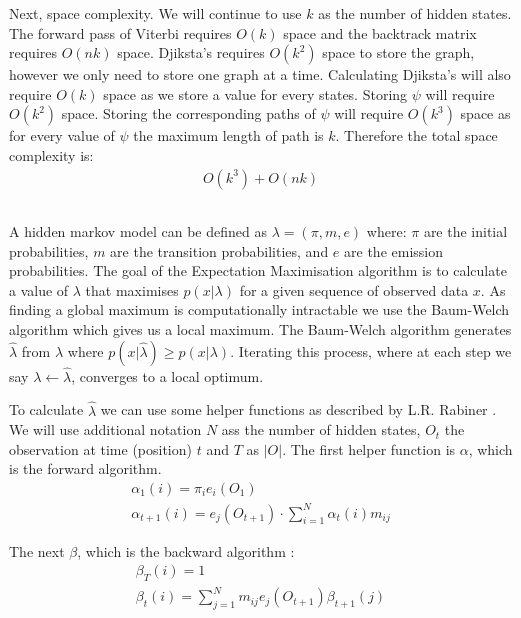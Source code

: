 Next, space complexity. We will continue to use $k$ as the number of hidden states. The forward pass of Viterbi requires $O(k)$ space and the backtrack matrix requires $O(nk)$ space. Djiksta's requires $O(k^2)$ space to store the graph, however we only need to store one graph at a time. Calculating Djiksta's will also require $O(k)$ space as we store a value for every states. Storing $\psi$ will require $O(k^2)$ space. Storing the corresponding paths of $\psi$ will require $O(k^3)$ space as for every value of $\psi$ the maximum length of path is $k$. Therefore the total space complexity is:
\begin{align*}
    O(k^3) + O(nk)
\end{align*} 



\subsection{}
A hidden markov model can be defined as $\lambda = (\pi, m, e)$ where: $\pi$ are the initial probabilities, $m$ are the transition probabilities, and $e$ are the emission probabilities.
The goal of the Expectation Maximisation algorithm is to calculate a value of $\lambda$ that maximises $p(x|\lambda)$ for a given sequence of observed data $x$. As finding a global maximum is computationally intractable we use the Baum-Welch algorithm which gives us a local maximum. The Baum-Welch algorithm generates $\hat{\lambda}$ from $\lambda$ where $p(x|\hat{\lambda}) \geq p(x|\lambda)$. Iterating this process, where at each step we say $\lambda \gets \hat{\lambda}$, converges to a local optimum.

To calculate $\hat{\lambda}$ we can use some helper functions as described by L.R. Rabiner \cite{em}. We will use additional notation $N$ ass the number of hidden states, $O_t$ the observation at time (position) $t$ and $T$ as $|O|$.  The first helper function is $\alpha$, which is the forward algorithm.
\begin{gather*}
    \alpha_1(i) = \pi_i e_i(O_1)\\
    \alpha_{t+1}(i) = e_j(O_{t+1}) \cdot \sum_{i=1}^N\alpha_t(i)m_{ij}
\end{gather*}

The next $\beta$, which is the backward algorithm :
\begin{gather*}
    \beta_T(i)=1\\
    \beta_t(i)=\sum_{j=1}^N m_{ij} e_j(O_{t+1}) \beta_{t+1}(j)
\end{gather*}

